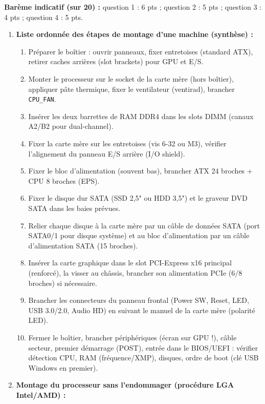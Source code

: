 \documentclass[11pt]{article}
\begin{document}
\begin{corrige}
\textbf{Barème indicatif (sur 20) :} question 1 : 6 pts ; question 2 : 5 pts ; question 3 : 4 pts ; question 4 : 5 pts.
\begin{enumerate}
  \item \textbf{Liste ordonnée des étapes de montage d'une machine (synthèse) :}
  \begin{enumerate}
    \item Préparer le boîtier : ouvrir panneaux, fixer entretoises (standard ATX), retirer caches arrières (slot brackets) pour GPU et E/S.
    \item Monter le processeur sur le socket de la carte mère (hors boîtier), appliquer pâte thermique, fixer le ventilateur (ventirad), brancher \texttt{CPU\_FAN}.
    \item Insérer les deux barrettes de RAM DDR4 dans les slots DIMM (canaux A2/B2 pour dual-channel).
    \item Fixer la carte mère sur les entretoises (vis 6-32 ou M3), vérifier l'alignement du panneau E/S arrière (I/O shield).
    \item Fixer le bloc d'alimentation (souvent bas), brancher ATX 24 broches + CPU 8 broches (EPS).
    \item Fixer le disque dur SATA (SSD 2,5" ou HDD 3,5") et le graveur DVD SATA dans les baies prévues.
    \item Relier chaque disque à la carte mère par un câble de données SATA (port SATA0/1 pour disque système) et au bloc d'alimentation par un câble d'alimentation SATA (15 broches).
    \item Insérer la carte graphique dans le slot PCI-Express x16 principal (renforcé), la visser au châssis, brancher son alimentation PCIe (6/8 broches) si nécessaire.
    \item Brancher les connecteurs du panneau frontal (Power SW, Reset, LED, USB 3.0/2.0, Audio HD) en suivant le manuel de la carte mère (polarité LED).
    \item Fermer le boîtier, brancher périphériques (écran sur GPU !), câble secteur, premier démarrage (POST), entrée dans le BIOS/UEFI : vérifier détection CPU, RAM (fréquence/XMP), disques, ordre de boot (clé USB Windows en premier).
  \end{enumerate}
  \item \textbf{Montage du processeur sans l'endommager (procédure LGA Intel/AMD) :}
  \begin{enumerate}

\end{enumerate}
\end{enumerate}
\end{corrige}
\end{document}
